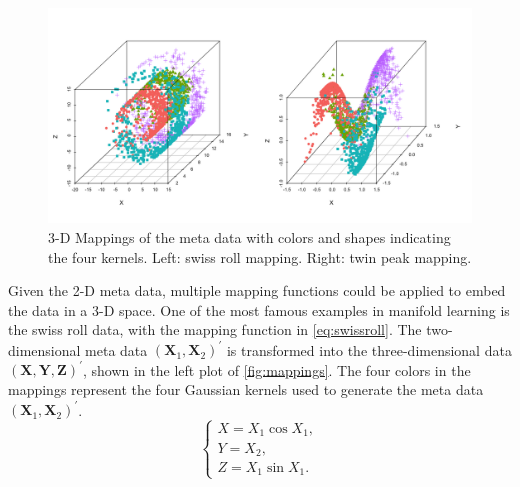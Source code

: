 \documentclass[11pt,a4paper,]{article}
\begin{document}
\begin{figure}

{\centering \includegraphics[width=0.8\linewidth]{figures/mappings_sr_tp} 

}

\caption{3-D Mappings of the meta data with colors and shapes indicating the four kernels. Left: swiss roll mapping. Right: twin peak mapping.}\label{fig:mappings}
\end{figure}

Given the 2-D meta data, multiple mapping functions could be applied to embed the data in a 3-D space. One of the most famous examples in manifold learning is the swiss roll data, with the mapping function in \eqref{eq:swissroll}. The two-dimensional meta data \((\pmb{X}_1, \pmb{X}_2)^\prime\) is transformed into the three-dimensional data \((\pmb{X}, \pmb{Y}, \pmb{Z})^\prime\), shown in the left plot of \autoref{fig:mappings}. The four colors in the mappings represent the four Gaussian kernels used to generate the meta data \((\pmb{X}_1, \pmb{X}_2)^\prime\).
\begin{equation}
\label{eq:swissroll}
\left\{
\begin{array}{lcl}
X = X_1 \cos{X_1}, \\
Y = X_2, \\
Z = X_1 \sin{X_1}.
\end{array}
\right.
\end{equation}
\end{document}
